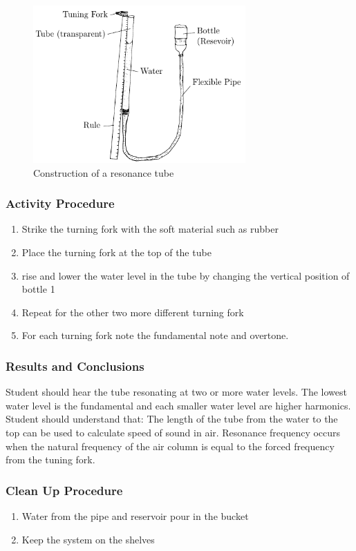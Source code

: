 \begin{figure}
\begin{center}
\includegraphics{./img/resonance-tube.png}
\caption{Construction of a resonance tube}
\label{fig:resonance-tube}
\end{center}
\end{figure}

\subsubsection*{Activity Procedure}
\begin{enumerate}
\item{Strike the turning fork with the soft material such as rubber}
\item{Place the turning fork at the top of the tube}
\item{rise and lower the water level in the tube by changing the vertical position of bottle 1}
\item{Repeat for the other two more different turning fork}
\item{For each turning fork note the fundamental note and overtone.} 
\end{enumerate}

\subsubsection*{Results and Conclusions}
Student should hear the tube resonating at two or more water levels. The lowest water level is the fundamental and each smaller water level are higher harmonics.  
Student should understand that: 
The length of the tube from the water to the top can be used to calculate speed of sound in air. 
Resonance frequency occurs when the natural frequency of the air column is equal to the forced frequency from the tuning fork.  

\subsubsection*{Clean Up Procedure}
\begin{enumerate}
\item{Water from the pipe and reservoir pour in the bucket}
\item{Keep the system on the shelves}
\end{enumerate}

